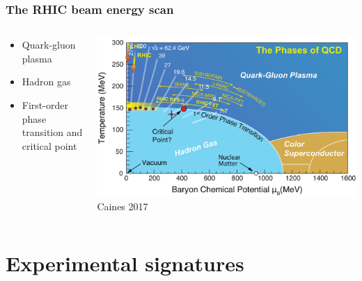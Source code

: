 \documentclass[accentcolor=tud2c,usenames,dvipsnames,colorbacktitle,inverttitle,landscape,german,presentation,t]{tudbeamer}
\begin{document}
  \begin{frame}
    \frametitle{The RHIC beam energy scan}
    \begin{columns}[c]
      \begin{column}{0.4\textwidth}
        \begin{itemize}
          \item Quark-gluon plasma
          \item Hadron gas
          \item First-order phase transition and critical point
        \end{itemize}
      \end{column}
      \begin{column}{0.6\textwidth}
        \begin{center}
          \includegraphics[width=\textwidth]{figures/02/PhaseDiagram}
          \\ \footnotesize{Caines 2017}
        \end{center}
      \end{column}
    \end{columns}
  \end{frame}

  \section{Experimental signatures}
\end{document}
